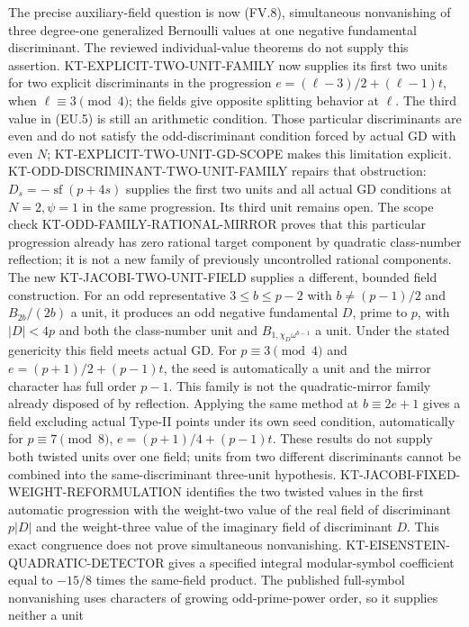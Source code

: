 The precise auxiliary-field question is now (FV.8), simultaneous
nonvanishing of three degree-one generalized Bernoulli values
at one negative fundamental discriminant. The reviewed
individual-value theorems do not supply this assertion.
KT-EXPLICIT-TWO-UNIT-FAMILY now supplies its first two
units for two explicit discriminants in the progression
$e=(\ell-3)/2+(\ell-1)t$, when $\ell\equiv3\pmod4$;
the fields give opposite splitting behavior at $\ell$.
The third value in (EU.5) is still an arithmetic condition.
Those particular discriminants are even and do not satisfy
the odd-discriminant condition forced by actual GD with even
$N$; KT-EXPLICIT-TWO-UNIT-GD-SCOPE makes this limitation explicit.
KT-ODD-DISCRIMINANT-TWO-UNIT-FAMILY repairs that obstruction:
$D_s=-\operatorname{sf}(p+4s)$ supplies the first two units
and all actual GD conditions at $N=2,\psi=1$ in the same
progression. Its third unit remains open. The scope check
KT-ODD-FAMILY-RATIONAL-MIRROR proves that this particular
progression already has zero rational target component by
quadratic class-number reflection; it is not a new family of
previously uncontrolled rational components.
The new KT-JACOBI-TWO-UNIT-FIELD supplies a different, bounded
field construction. For an odd representative $3\le b\le p-2$
with $b\ne(p-1)/2$ and $B_{2b}/(2b)$ a unit, it produces
an odd negative fundamental $D$, prime to $p$, with $|D|<4p$
and both the class-number unit and $B_{1,\chi_D\omega^{b-1}}$
a unit. Under the stated genericity this field meets actual GD.
For $p\equiv3\pmod4$ and $e=(p+1)/2+(p-1)t$, the seed
is automatically a unit and the mirror character has full
order $p-1$. This family is not the quadratic-mirror family
already disposed of by reflection. Applying the same method
at $b\equiv2e+1$ gives a field excluding actual Type-II points
under its own seed condition, automatically for
$p\equiv7\pmod8$, $e=(p+1)/4+(p-1)t$.
These results do not supply both twisted units over one field;
units from two different discriminants cannot be combined into
the same-discriminant three-unit hypothesis.
KT-JACOBI-FIXED-WEIGHT-REFORMULATION identifies the two twisted
values in the first automatic progression with the weight-two
value of the real field of discriminant $p|D|$ and the
weight-three value of the imaginary field of discriminant $D$.
This exact congruence does not prove simultaneous nonvanishing.
KT-EISENSTEIN-QUADRATIC-DETECTOR gives a specified integral
modular-symbol coefficient equal to $-15/8$ times the same-field
product. The published full-symbol nonvanishing uses characters
of growing odd-prime-power order, so it supplies neither a unit

